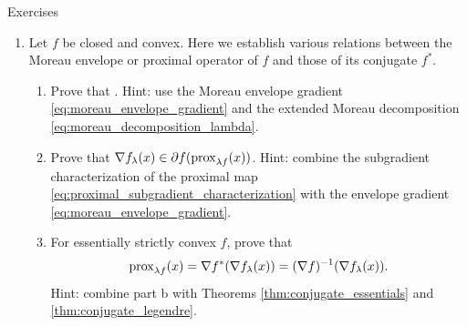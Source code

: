 \begin{xcb}{Exercises}
\begin{enumerate}[label=\thechapter.\arabic*]
\item Let $f$ be closed and convex. Here we establish various relations between
  the Moreau envelope or proximal operator of $f$ and those of its conjugate
  $f^*$. 

\begin{enumerate}[label=\alph*.]
\item Prove that . Hint: use the Moreau envelope gradient
\eqref{eq:moreau_envelope_gradient} and the extended Moreau decomposition
\eqref{eq:moreau_decomposition_lambda}.   

\item Prove that $\nabla f_\lambda(x) \in \partial f (\operatorname{prox}_{\lambda
    f}(x))$. Hint: combine the subgradient characterization of the proximal map
  \eqref{eq:proximal_subgradient_characterization} with the envelope gradient 
  \eqref{eq:moreau_envelope_gradient}.  

\item For essentially strictly convex $f$, prove that 
  \[
  \operatorname{prox}_{\lambda  f}(x) = \nabla f^*(\nabla f_\lambda(x)) = (\nabla f)^{-1}
  (\nabla f_\lambda(x)).
  \]
  Hint: combine part b with Theorems \ref{thm:conjugate_essentials} and
  \ref{thm:conjugate_legendre}. 
\end{enumerate}
\end{enumerate}
\end{xcb}
